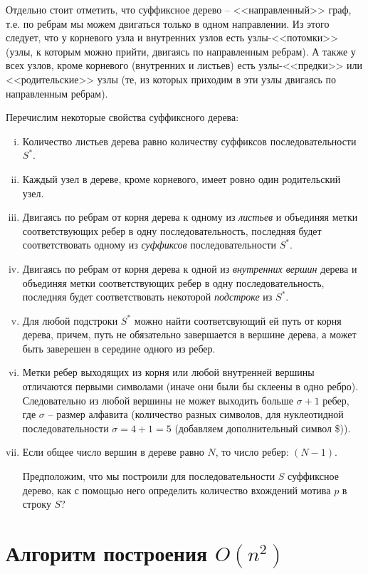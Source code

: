 \documentclass[letterpaper, 11pt]{article}
\begin{document}
Отдельно стоит отметить, что суффиксное дерево -- <<направленный>> граф, т.е. по ребрам мы можем двигаться только в одном направлении. Из этого следует, что у корневого узла и внутренних узлов есть узлы-<<потомки>> (узлы, к которым можно прийти, двигаясь по направленным ребрам). А также у всех узлов, кроме корневого (внутренних и листьев) есть узлы-<<предки>> или <<родительские>> узлы (те, из которых приходим в эти узлы двигаясь по направленным ребрам). 

Перечислим некоторые свойства суффиксного дерева:
\begin{enumerate}[(i)]
\item
Количество листьев дерева равно количеству суффиксов последовательности $S^*$.
\item
Каждый узел в дереве, кроме корневого, имеет ровно один родительский узел.
\item
Двигаясь по ребрам от корня дерева к одному из \textit{листьев} и объединяя метки соответствующих ребер в одну последовательность, последняя будет соответствовать одному из \textit{суффиксов} последовательности $S^*$.
\item
Двигаясь по ребрам от корня дерева к одной из \textit{внутренних вершин} дерева и объединяя метки соответствующих ребер в одну последовательность, последняя будет соответствовать некоторой \textit{подстроке} из $S^*$.
\item
Для любой подстроки $S^*$ можно найти соответсвующий ей путь от корня дерева, причем, путь не обязательно завершается в вершине дерева, а может быть заверешен в середине одного из ребер.
\item
Метки ребер выходящих из корня или любой внутренней вершины отличаются первыми символами (иначе они были бы склеены в одно ребро). Следовательно из любой вершины не может выходить больше $\sigma + 1$ ребер, где $\sigma$ -- размер алфавита (количество разных символов, для нуклеотидной последовательности $\sigma = 4 + 1 = 5$ (добавляем дополнительный символ \$)).
\item
Если общее число вершин в дереве равно $N$, то число ребер: $(N - 1)$.

Предположим, что мы построили для последовательности $S$ суффиксное дерево, как с помощью него определить количество вхождений мотива $p$ в строку $S$?
\end{enumerate}

\clearpage
\section{Алгоритм построения $O(n^2)$}
\end{document}
